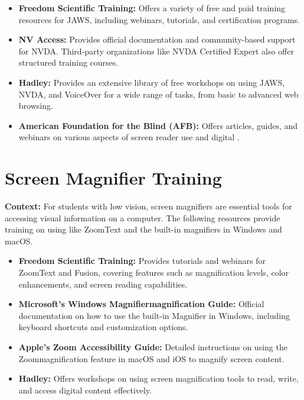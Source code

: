 \begin{itemize}
	\item \textbf{Freedom Scientific Training:} Offers a variety of free and paid training resources for JAWS, including webinars, tutorials, and certification programs.
	\item \textbf{NV Access:} Provides official documentation and community-based support for NVDA. Third-party organizations like NVDA Certified Expert also offer structured training courses.
	\item \textbf{Hadley:} Provides an extensive library of free workshops on using JAWS, NVDA, and VoiceOver for a wide range of tasks, from basic  to advanced web browsing.
	\item \textbf{American Foundation for the Blind (AFB):} Offers articles, guides, and webinars on various aspects of screen reader use and digital .
\end{itemize}

\section[Screen Magnifier Training]{Screen Magnifier Training}\label{app4:magnifier-training}

\noindent
\textbf{Context:} For students with low vision, screen magnifiers are essential tools for accessing visual information on a computer. The following resources provide training on using  like ZoomText and the built-in magnifiers in Windows and macOS.

\begin{itemize}
	\item \textbf{Freedom Scientific Training:} Provides tutorials and webinars for ZoomText and Fusion, covering features such as magnification levels, color enhancements, and screen reading capabilities.
	\item \textbf{Microsoft's Windows Magnifiermagnification Guide:} Official documentation on how to use the built-in Magnifier in Windows, including keyboard shortcuts and customization options.
	\item \textbf{Apple's Zoom Accessibility Guide:} Detailed instructions on using the Zoommagnification feature in macOS and iOS to magnify screen content.
	\item \textbf{Hadley:} Offers workshops on using screen magnification tools to read, write, and access digital content effectively.
\end{itemize}

